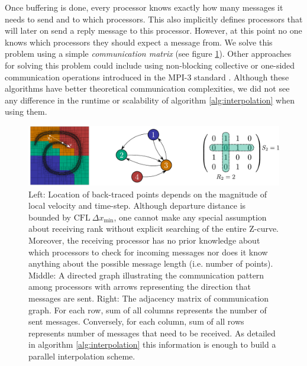 Once buffering is done, every processor knows exactly how many messages it needs to send and to which processors. This also implicitly defines processors that will later on send a reply message to this processor. However, at this point no one knows which processors they should expect a message from. We solve this problem using a simple \textit{communication matrix} (see figure \ref{fig:communication}). Other approaches for solving this problem could include using non-blocking collective or one-sided communication operations introduced in the MPI-3 standard \cite{MPI_ref, sparse dynamic exchange protocol paper}. Although these algorithms have better theoretical communication complexities, we did not see any difference in the runtime or scalability of algorithm \ref{alg:interpolation} when using them. 

\begin{figure}[htbp]
\begin{center}
\includegraphics[width = \textwidth] {figures/communication.pdf}
\end{center}
\caption{Left: Location of back-traced points depends on the magnitude of local velocity and time-step. Although departure distance is bounded by $\text{CFL} \: \Delta x_{\min}$, one cannot make any special assumption about receiving rank without explicit searching of the entire Z-curve. Moreover, the receiving processor has no prior knowledge about which processors to check for incoming messages nor does it know anything about the possible message length (i.e. number of points). Middle: A directed graph illustrating the communication pattern among processors with arrows representing the direction that messages are sent. Right: The adjacency matrix of communication graph. For each row, sum of all columns represents the number of sent messages. Conversely, for each column, sum of all rows represents number of messages that need to be received. As detailed in algorithm \ref{alg:interpolation} this information is enough to build a parallel interpolation scheme.}
\label{fig:communication}
\end{figure}

